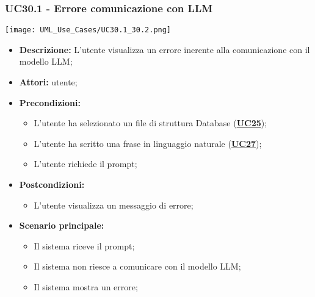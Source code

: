 \subsubsection{UC30.1 - Errore comunicazione con LLM}
\label{sec:UC30.1}
\texttt{[image: UML\_Use\_Cases/UC30.1\_30.2.png]}
\begin{itemize}
	\item \textbf{Descrizione:} L’utente visualizza un errore inerente alla comunicazione con il modello LLM;
	\item \textbf{Attori:} utente;
	\item \textbf{Precondizioni:} 
	\begin{itemize}
		\item L’utente ha selezionato un file di struttura Database (\hyperref[sec:UC25]{\textbf{UC25}});
		\item L’utente ha scritto una frase in linguaggio naturale (\hyperref[sec:UC27]{\textbf{UC27}});
		\item L’utente richiede il prompt;
	\end{itemize}
	\item \textbf{Postcondizioni:} 
	\begin{itemize}
		\item L’utente visualizza un messaggio di errore;
	\end{itemize}
	\item \textbf{Scenario principale:} 
	\begin{itemize}
		\item Il sistema riceve il prompt;
		\item Il sistema non riesce a comunicare con il modello LLM;
		\item Il sistema mostra un errore;
	\end{itemize}
\end{itemize}

